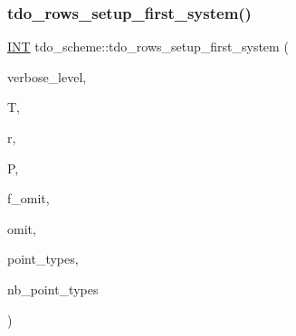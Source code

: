 \subsubsection{\texorpdfstring{tdo\+\_\+rows\+\_\+setup\+\_\+first\+\_\+system()}{tdo\_rows\_setup\_first\_system()}}
{\footnotesize\ttfamily \mbox{\hyperlink{galois_8h_a09fddde158a3a20bd2dcadb609de11dc}{I\+NT}} tdo\+\_\+scheme\+::tdo\+\_\+rows\+\_\+setup\+\_\+first\+\_\+system (\begin{DoxyParamCaption}\item[{\mbox{\hyperlink{galois_8h_a09fddde158a3a20bd2dcadb609de11dc}{I\+NT}}}]{verbose\+\_\+level,  }\item[{\mbox{\hyperlink{classtdo__data}{tdo\+\_\+data}} \&}]{T,  }\item[{\mbox{\hyperlink{galois_8h_a09fddde158a3a20bd2dcadb609de11dc}{I\+NT}}}]{r,  }\item[{\mbox{\hyperlink{classpartitionstack}{partitionstack}} \&}]{P,  }\item[{\mbox{\hyperlink{galois_8h_a09fddde158a3a20bd2dcadb609de11dc}{I\+NT}}}]{f\+\_\+omit,  }\item[{\mbox{\hyperlink{galois_8h_a09fddde158a3a20bd2dcadb609de11dc}{I\+NT}}}]{omit,  }\item[{\mbox{\hyperlink{galois_8h_a09fddde158a3a20bd2dcadb609de11dc}{I\+NT}} $\ast$\&}]{point\+\_\+types,  }\item[{\mbox{\hyperlink{galois_8h_a09fddde158a3a20bd2dcadb609de11dc}{I\+NT}} \&}]{nb\+\_\+point\+\_\+types }\end{DoxyParamCaption})}

\mbox{\label{classtdo__scheme_a2696ae51d7d125632db1919c9970048a}} 
